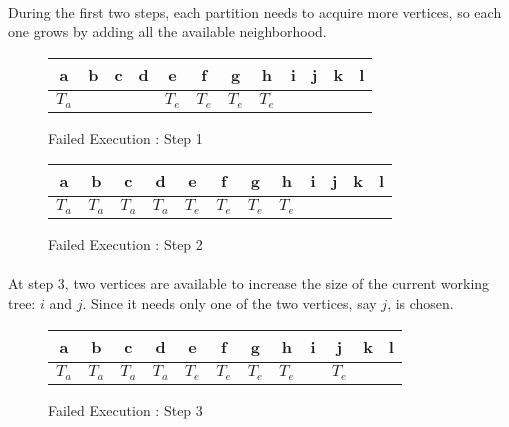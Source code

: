 \paragraph{}
During the first two steps, each partition needs to acquire more vertices, so
each one grows by adding all the available neighborhood.

\begin{figure}[H]
  \caption{Failed Execution : Step 1}
  \begin{center}
    \begin{tikzpicture}[scale=0.9,transform shape]
      
    \end{tikzpicture}
    \begin{tabular}{|c|c|c|c|c|c|c|c|c|c|c|c|}
\hline
a & b & c & d & e & f & g & h & i & j & k & l\\
\hline
$T_a$ & & & & $T_e$ & $T_e$ & $T_e$ & $T_e$ & & & &\\
\hline
    \end{tabular}
  \end{center}
\end{figure}

\begin{figure}[H]
  \caption{Failed Execution : Step 2}
  \begin{center}
    \begin{tikzpicture}[scale=0.9,transform shape]
      
    \end{tikzpicture}
    \begin{tabular}{|c|c|c|c|c|c|c|c|c|c|c|c|}
\hline
a & b & c & d & e & f & g & h & i & j & k & l\\
\hline
$T_a$ & $T_a$ & $T_a$ & $T_a$ & $T_e$ & $T_e$ & $T_e$ & $T_e$ & & & &\\
\hline
    \end{tabular}
  \end{center}
\end{figure}

\paragraph{}
At step 3, two vertices are available to increase the size of the current
working tree: $i$ and $j$. Since it needs only one of the two vertices, say
$j$,  is chosen.

\begin{figure}[H]
  \caption{Failed Execution : Step 3}
  \begin{center}
    \begin{tikzpicture}[scale=0.9,transform shape]
      
    \end{tikzpicture}
    \begin{tabular}{|c|c|c|c|c|c|c|c|c|c|c|c|}
\hline
a & b & c & d & e & f & g & h & i & j & k & l\\
\hline
$T_a$ & $T_a$ & $T_a$ & $T_a$ & $T_e$ & $T_e$ & $T_e$ & $T_e$ & & $T_e$ & &\\
\hline
    \end{tabular}
  \end{center}
\end{figure}

